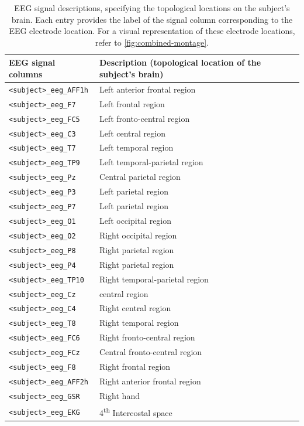 \begin{table}
\centering
\begin{tabularx}{\textwidth}{lX}
    \toprule
    EEG signal columns & Description (topological location of the subject's brain) \\
    \midrule
    \texttt{<subject>\_eeg\_AFF1h} & Left anterior frontal region \\
    \texttt{<subject>\_eeg\_F7} & Left frontal region  \\
    \texttt{<subject>\_eeg\_FC5} & Left fronto-central region  \\
    \texttt{<subject>\_eeg\_C3} & Left central region \\
    \texttt{<subject>\_eeg\_T7} & Left temporal region \\
    \texttt{<subject>\_eeg\_TP9} & Left temporal-parietal region \\
    \texttt{<subject>\_eeg\_Pz} & Central parietal region \\
    \texttt{<subject>\_eeg\_P3} & Left parietal region \\
    \texttt{<subject>\_eeg\_P7} & Left parietal region \\
    \texttt{<subject>\_eeg\_O1} & Left occipital region \\
    \texttt{<subject>\_eeg\_O2} & Right occipital region \\
    \texttt{<subject>\_eeg\_P8} & Right parietal region \\
    \texttt{<subject>\_eeg\_P4} & Right parietal region \\
    \texttt{<subject>\_eeg\_TP10} & Right temporal-parietal region \\
    \texttt{<subject>\_eeg\_Cz} & central region \\
    \texttt{<subject>\_eeg\_C4} & Right central region \\
    \texttt{<subject>\_eeg\_T8} & Right temporal region \\
    \texttt{<subject>\_eeg\_FC6} & Right fronto-central region \\
    \texttt{<subject>\_eeg\_FCz} & Central fronto-central region \\
    \texttt{<subject>\_eeg\_F8} & Right frontal region \\
    \texttt{<subject>\_eeg\_AFF2h} & Right anterior frontal region \\
    \texttt{<subject>\_eeg\_GSR} & Right hand \\
    \texttt{<subject>\_eeg\_EKG} & 4\textsuperscript{th} Intercostal space \\
    \bottomrule
\end{tabularx}
\caption{%
    EEG signal descriptions, specifying the topological locations on
    the subject's brain. Each entry provides the label of the signal column
    corresponding to the EEG electrode location. For a visual representation of
    these electrode locations, refer to \autoref{fig:combined-montage}.
}
\label{tab:EEG_signals}
\end{table}

